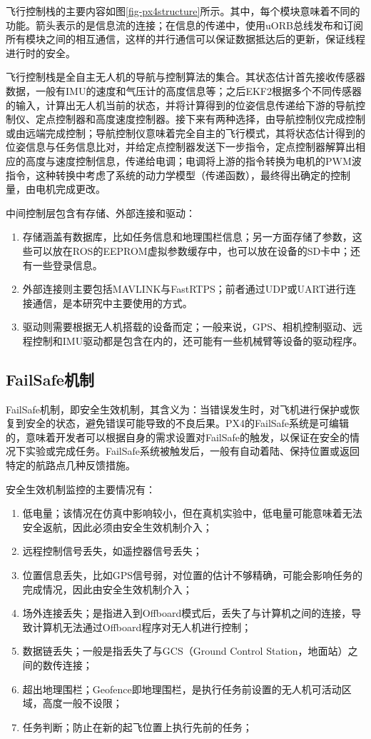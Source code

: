 飞行控制栈的主要内容如图\ref{fig-px4structure}所示。其中，每个模块意味着不同的功能。箭头表示的是信息流的连接；在信息的传递中，使用uORB总线发布和订阅所有模块之间的相互通信，这样的并行通信可以保证数据抵达后的更新，保证线程进行时的安全。

飞行控制栈是全自主无人机的导航与控制算法的集合。其状态估计首先接收传感器数据，一般有IMU的速度和气压计的高度信息等；之后EKF2根据多个不同传感器的输入，计算出无人机当前的状态，并将计算得到的位姿信息传递给下游的导航控制仪、定点控制器和高度速度控制器。接下来有两种选择，由导航控制仪完成控制或由远端完成控制；导航控制仪意味着完全自主的飞行模式，其将状态估计得到的位姿信息与任务信息比对，并给定点控制器发送下一步指令，定点控制器解算出相应的高度与速度控制信息，传递给电调；电调将上游的指令转换为电机的PWM波指令，这种转换中考虑了系统的动力学模型（传递函数），最终得出确定的控制量，由电机完成更改。

中间控制层包含有存储、外部连接和驱动：
\begin{enumerate}
	\item 存储涵盖有数据库，比如任务信息和地理围栏信息；另一方面存储了参数，这些可以放在ROS的EEPROM虚拟参数缓存中，也可以放在设备的SD卡中；还有一些登录信息。
	\item
	外部连接则主要包括MAVLINK与FastRTPS；前者通过UDP或UART进行连接通信，是本研究中主要使用的方式。
	\item 
	驱动则需要根据无人机搭载的设备而定；一般来说，GPS、相机控制驱动、远程控制和IMU驱动都是包含在内的，还可能有一些机械臂等设备的驱动程序。
\end{enumerate}


\subsection{FailSafe机制} \label{2.2.1}
FailSafe机制，即安全生效机制，其含义为：当错误发生时，对飞机进行保护或恢复到安全的状态，避免错误可能导致的不良后果。PX4的FailSafe系统是可编辑的，意味着开发者可以根据自身的需求设置对FailSafe的触发，以保证在安全的情况下实验或完成任务。FailSafe系统被触发后，一般有自动着陆、保持位置或返回特定的航路点几种反馈措施。

安全生效机制监控的主要情况有：
\begin{enumerate}
	\item 低电量；该情况在仿真中影响较小，但在真机实验中，低电量可能意味着无法安全返航，因此必须由安全生效机制介入；
	\item 远程控制信号丢失，如遥控器信号丢失；
	\item 位置信息丢失，比如GPS信号弱，对位置的估计不够精确，可能会影响任务的完成情况，因此由安全生效机制介入；
	\item 场外连接丢失；是指进入到Offboard模式后，丢失了与计算机之间的连接，导致计算机无法通过Offboard程序对无人机进行控制；
	\item 数据链丢失；一般是指丢失了与GCS（Ground Control Station，地面站）之间的数传连接；
	\item 超出地理围栏；Geofence即地理围栏，是执行任务前设置的无人机可活动区域，高度一般不设限；
	\item 任务判断；防止在新的起飞位置上执行先前的任务；
\end{enumerate}

